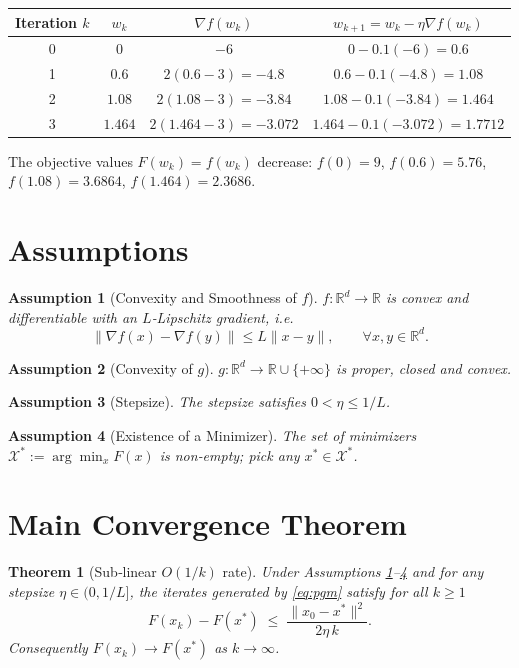 \documentclass{article}
\newtheorem{theorem}{Theorem}
\newtheorem{assumption}{Assumption}
\begin{document}
\begin{center}
\begin{tabular}{c|c|c|c}
Iteration $k$ & $w_{k}$ & $\nabla f(w_{k})$ & $w_{k+1}=w_{k}-\eta\nabla f(w_{k})$ \\ \hline
0 & $0$ & $-6$ & $0-0.1(-6)=0.6$ \\
1 & $0.6$ & $2(0.6-3)=-4.8$ & $0.6-0.1(-4.8)=1.08$ \\
2 & $1.08$ & $2(1.08-3)=-3.84$ & $1.08-0.1(-3.84)=1.464$ \\
3 & $1.464$ & $2(1.464-3)=-3.072$ & $1.464-0.1(-3.072)=1.7712$
\end{tabular}
\end{center}
The objective values $F(w_{k})=f(w_{k})$ decrease:
$f(0)=9$, $f(0.6)=5.76$, $f(1.08)=3.6864$, $f(1.464)=2.3686$.

\newpage
\section*{Assumptions}
\begin{assumption}[Convexity and Smoothness of $f$]\label{as:convex}
$f:\mathbb R^{d}\to\mathbb R$ is convex and differentiable with an $L$‑Lipschitz gradient, i.e.  
\[
\|\nabla f(x)-\nabla f(y)\|\le L\|x-y\|,\qquad\forall x,y\in\mathbb R^{d}.
\] 
\end{assumption}
\begin{assumption}[Convexity of $g$]\label{as:gconvex}
$g:\mathbb R^{d}\to\mathbb R\cup\{+\infty\}$ is proper, closed and convex.
\end{assumption}
\begin{assumption}[Stepsize]\label{as:stepsize}
The stepsize satisfies $0<\eta\le 1/L$.
\end{assumption}
\begin{assumption}[Existence of a Minimizer]\label{as:exist}
The set of minimizers $\mathcal X^{*}:=\arg\min_{x}F(x)$ is non‑empty; pick any $x^{*}\in\mathcal X^{*}$.
\end{assumption}

\section*{Main Convergence Theorem}
\begin{theorem}[Sub‑linear $O(1/k)$ rate]\label{thm:rate}
Under Assumptions \ref{as:convex}–\ref{as:exist} and for any stepsize $\eta\in(0,1/L]$, the iterates generated by \eqref{eq:pgm} satisfy for all $k\ge1$  
\[
F(x_{k})-F(x^{*})\;\le\;\frac{\|x_{0}-x^{*}\|^{2}}{2\eta\,k}.
\] 
Consequently $F(x_{k})\to F(x^{*})$ as $k\to\infty$.
\end{theorem}
\end{document}
